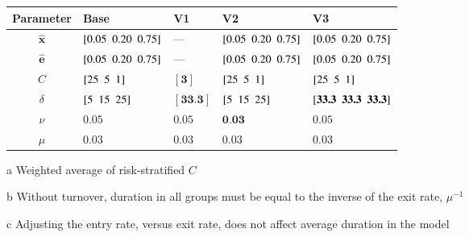 \begin{threeparttable}
\begin{tabularx}{0.95\linewidth}{c *{4}{Y}}
	\toprule
	  Parameter    & Base                     & V1                           & V2                       & V3                                         \\
	\midrule
	$\bm{\hat{x}}$ & $[ 0.05\enspace0.20\enspace0.75 ]$ & ---                          & $[ 0.05\enspace0.20\enspace0.75 ]$ & $[ 0.05\enspace0.20\enspace0.75 ]$                   \\
	$\bm{\hat{e}}$ & $[ 0.05\enspace0.20\enspace0.75 ]$ & ---                          & $[ 0.05\enspace0.20\enspace0.75 ]$ & $[ 0.05\enspace0.20\enspace0.75 ]$                   \\
	     $C$       & $[ 25\enspace5\enspace1 ]$         & $[ \textbf{3} ]$    & $[ 25\enspace5\enspace1 ]$         & $[ 25\enspace5\enspace1 ]$                           \\
	   $\delta$    & $[ 5\enspace15\enspace25 ]$        & $[ \textbf{33.3} ]$ & $[ 5\enspace15\enspace25 ]$        & $[ \textbf{33.3\enspace33.3\enspace33.3} ]$ \\
	    $\nu$      & $0.05$                   & $0.05$                       & $\textbf{0.03}$ & $0.05$                                     \\
	    $\mu$      & $0.03$                   & $0.03$                       & $0.03$                   & $0.03$                                     \\
	\bottomrule
\end{tabularx}
\footnotesize
\begin{tablenotes}
  \item[a] Weighted average of risk-stratified $C$
  \item[b] Without turnover, duration in all groups must be equal to the inverse of the exit rate, $\mu^{-1}$
  \item[c] Adjusting the entry rate, versus exit rate, does not affect average duration in the model
\end{tablenotes}
\end{threeparttable}